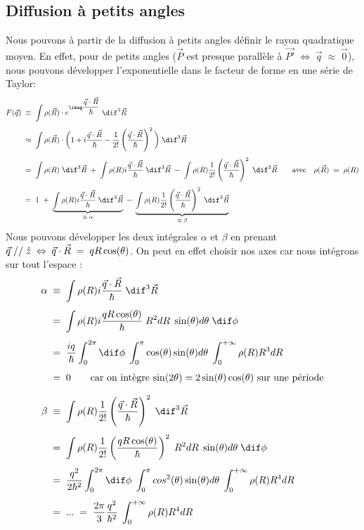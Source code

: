 \subsection{Diffusion à petits angles}


Nous pouvons à partir de la diffusion à petits angles définir le rayon quadratique moyen. En effet, pour de petits angles ($\vec{P}$ est presque parallèle à $\vec{P'} \; \Leftrightarrow \; \vec{q}\;\approx\;\vec{0}$), nous pouvons développer l'exponentielle dans le facteur de forme en une série de Taylor:
\begin{align*}
    F(\vec{q}) &\;\equiv\;
    \int \rho(\vec{R}) \cdot e^{\imag\dfrac{\vec{q} \cdot \vec{R}}{\hbar}} \; \dif^3\vec{R}\\[4pt]
    &\;\approx\;
    \int \rho(\vec{R}) \cdot \bigg( 
    1 + i\dfrac{\vec{q}\cdot\vec{R}}{\hbar} - \dfrac{1}{2!} \left( \dfrac{\vec{q}\cdot\vec{R}}{\hbar}\right)^2
    \bigg) \; \dif^3\vec{R}\\[4pt]
    &\eq
    \int \rho(R) \;\dif^3\vec{R}
    \;+\;
    \int \rho(R)  i\dfrac{\vec{q}\cdot\vec{R}}{\hbar} \; \dif^3\vec{R}
    \;-\;
    \int \rho(R)  \dfrac{1}{2!} \left( \dfrac{\vec{q}\cdot\vec{R}}{\hbar}\right)^2  \; \dif^3\vec{R}
    \qquad \text{avec} \quad \rho(\vec{R}) \eq \rho(R)\\[4pt]
    &\eq
    1
    \;+\;
    \underbrace{\int \rho(R)  i\dfrac{\vec{q}\cdot\vec{R}}{\hbar} \; \dif^3\vec{R}}_{\equiv \; \alpha} 
    \;-\;
    \underbrace{ \int \rho(R)  \dfrac{1}{2!} \left( \dfrac{\vec{q}\cdot\vec{R}}{\hbar}\right)^2  \; \dif^3\vec{R}}_{\equiv \; \beta}
\end{align*}
Nous pouvons développer les deux intégrales $\alpha$ et $\beta$ en prenant $\vec{q}\; \slash{}\slash{}\; \hat{z} \;\Leftrightarrow\; \vec{q}\cdot\vec{R} \; = \; qR\cos(\theta)$. On peut en effet choisir nos axes car nous intégrons sur tout l'espace :
\begin{align*}
    \alpha &\;\equiv\;
    \int \rho(R)  i\dfrac{\vec{q}\cdot\vec{R}}{\hbar} \; \dif^3\vec{R}\\[4pt]
    &\eq
    \int \rho(R)  i\dfrac{qR\cos(\theta)}{\hbar} \; R^2dR \;\sin(\theta)d\theta \; \dif\phi\\[4pt]
    &\eq
    \dfrac{iq}{\hbar} \int_0^{2\pi} \dif\phi \; \int_0^{\pi} \cos(\theta) \sin(\theta) d\theta \;\int_0^{+\infty}\rho(R) R^3 dR \\[4pt]
    &\eq 0 \qquad \text{car on intègre $\sin(2\theta)=2\sin(\theta)\cos(\theta)$ sur une période}
    \\[7pt]
    \beta &\;\equiv\;
    \int \rho(R)  \dfrac{1}{2!} \left( \dfrac{\vec{q}\cdot\vec{R}}{\hbar}\right)^2  \; \dif^3\vec{R}\\[4pt]
    &\eq
    \int \rho(R)  \dfrac{1}{2!} \left( \dfrac{qR\cos(\theta)}{\hbar}\right)^2  \; R^2dR \;\sin(\theta)d\theta \; \dif\phi\\[4pt]
    &\eq
    \dfrac{q^2}{2\hbar^2}
    \int_0^{2\pi} \dif\phi \; \int_0^{\pi} cos^2(\theta) \sin(\theta) d\theta \;\int_0^{+\infty}\rho(R) R^4 dR \\[4pt]
    &\eq ... \eq \dfrac{2\pi}{3}\dfrac{q^2}{\hbar^2} \;\int_0^{+\infty}\rho(R) R^4 dR
\end{align*}
